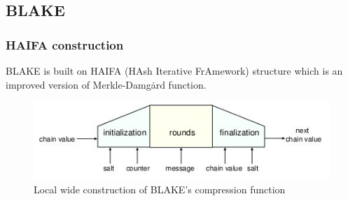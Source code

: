\documentclass{beamer}
\begin{document}
\subsection{BLAKE}


\begin{frame}
\frametitle{HAIFA construction}
BLAKE is built on HAIFA (HAsh Iterative FrAmework) structure \footnotemark which is an improved version of 
Merkle-Damg\.{a}rd function.
\begin{figure}[h]
  \begin{center}
    \includegraphics[scale=0.5]{blakelocalwidepipeconstruction.jpg}
  \end{center}
  \caption{Local wide construction of BLAKE's compression function\footnotemark}
  \label{fig:seq}
\end{figure}
\end{frame}
\end{document}
